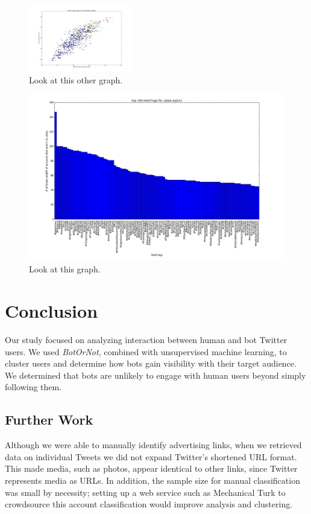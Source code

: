\documentclass{sig-alternate-05-2015}
\begin{document}
\begin{figure}
	\caption{Look at this other graph.}
	\centering
		\includegraphics[width=0.4\textwidth]{imgs/svacs}
\end{figure}

\begin{figure}
  \caption{Look at this graph.}
  \centering
    \includegraphics[width=\textwidth]{imgs/bhvc}
\end{figure}

\section{Conclusion}
Our study focused on analyzing interaction between human and bot Twitter users. We used \emph{BotOrNot}, combined with unsupervised machine learning, to cluster users and determine how bots gain visibility with their target audience. We determined that bots are unlikely to engage with human users beyond simply following them.

\subsection{Further Work}
Although we were able to manually identify advertising links, when we retrieved data on individual Tweets we did not expand Twitter's shortened URL format. This made media, such as photos, appear identical to other links, since Twitter represents media as URLs. In addition, the sample size for manual classification was small by necessity; setting up a web service such as Mechanical Turk to crowdsource this account classification would improve analysis and clustering.
\end{document}
